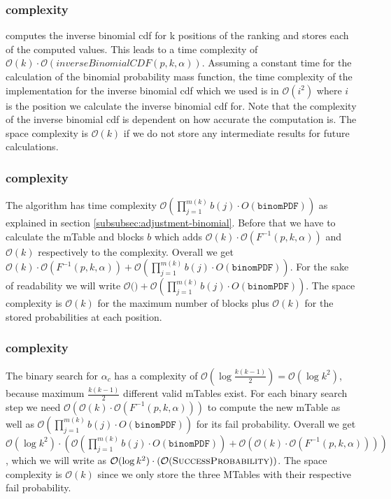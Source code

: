 \subsubsection{\algoMtable complexity}\label{subsubsec:construct-mtable-complexity}
\algoMtable computes the inverse binomial cdf for k positions of the ranking and stores each of the computed values.
%
This leads to a time complexity of $\mathcal{O}(k) \cdot \mathcal{O}(inverseBinomialCDF(p,k,\alpha))$.  Assuming a constant time for the calculation of the binomial probability mass function, the time complexity of the implementation for the inverse binomial cdf which we used is in $\mathcal{O}(i^2)$ where $i$ is the position we calculate the inverse binomial cdf for.
%
Note that the complexity of the inverse binomial cdf is dependent on how accurate the computation is.
%
The space complexity is $\mathcal{O}(k)$ if we do not store any intermediate results for future calculations.
%
\subsubsection{\algoRecursive complexity}\label{subsubsec:success-prob-complexity}
The algorithm \algoRecursive has time complexity $\mathcal{O}(\prod_{j=1}^{m(k)}b(j) \cdot O(\texttt{binomPDF}))$ as explained in section \ref{subsubsec:adjustment-binomial}.
%
Before that we have to calculate the mTable and blocks $b$ which adds $\mathcal{O}(k) \cdot \mathcal{O}(F^{-1}(p,k,\alpha))$ and $\mathcal{O}(k)$ respectively to the complexity.
%
Overall we get $\mathcal{O}(k) \cdot \mathcal{O}(F^{-1}(p,k,\alpha)) + \mathcal{O}(\prod_{j=1}^{m(k)}b(j) \cdot O(\texttt{binomPDF}))$.
%
For the sake of readability we will write $\mathcal{O}($\algoMtable$) + \mathcal{O}(\prod_{j=1}^{m(k)}b(j) \cdot O(\texttt{binomPDF}))$.
%
The space complexity is $\mathcal{O}(k)$ for the maximum number of blocks plus $\mathcal{O}(k)$ for the stored probabilities at each position.
%
\subsubsection{\algoBinomBinary complexity}\label{subsubsec:binom-binary-complexity}
The binary search for $\alpha_c$ has a complexity of $\mathcal{O}(\log{}\frac{k(k-1)}{2}) = \mathcal{O}(\log{}k^2)$, because maximum $\frac{k(k-1)}{2}$ different valid mTables exist.
%
For each binary search step we need $\mathcal{O}(\mathcal{O}(k) \cdot \mathcal{O}(F^{-1}(p,k,\alpha)))$ to compute the new mTable as well as $\mathcal{O}(\prod_{j=1}^{m(k)}b(j) \cdot O(\texttt{binomPDF}))$ for its fail probability.
%
Overall we get $\mathcal{O}(\log{}k^2) \cdot (\mathcal{O}(\prod_{j=1}^{m(k)}b(j) \cdot O(\texttt{binomPDF})) + \mathcal{O}(\mathcal{O}(k) \cdot \mathcal{O}(F^{-1}(p,k,\alpha))))$, which we will write as $\mathcal{O}(\log{}k^2) \cdot (\mathcal{O}(\texttt{{\sc SuccessProbability}}))$.
%
The space complexity is $\mathcal{O}(k)$ since we only store the three MTables with their respective fail probability.